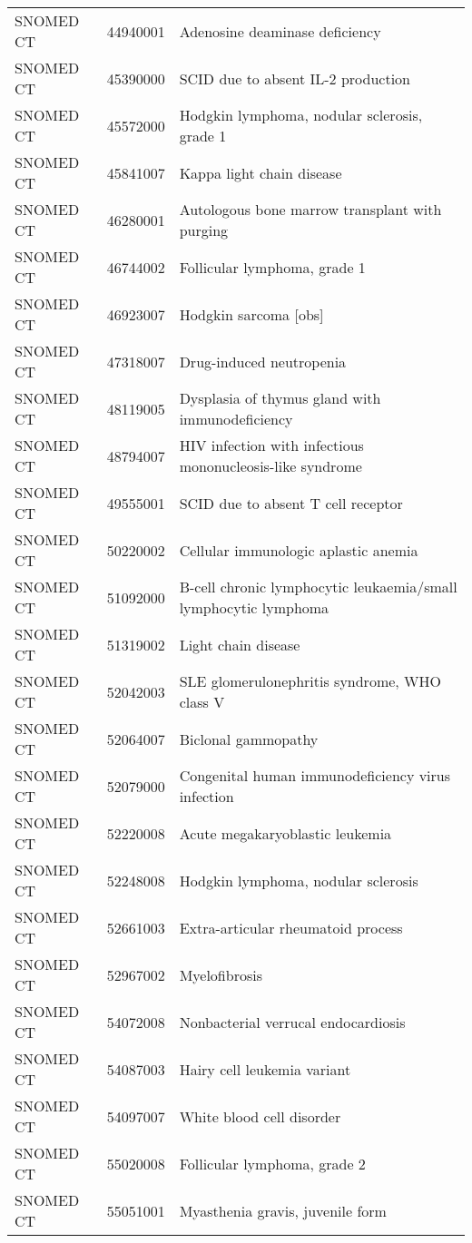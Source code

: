 \begin{longtable}{p{}p{}p{}}
  SNOMED CT & 44940001 & Adenosine deaminase deficiency \\ 
  SNOMED CT & 45390000 & SCID due to absent IL-2 production \\ 
  SNOMED CT & 45572000 & Hodgkin lymphoma, nodular sclerosis, grade 1 \\ 
  SNOMED CT & 45841007 & Kappa light chain disease \\ 
  SNOMED CT & 46280001 & Autologous bone marrow transplant with purging \\ 
  SNOMED CT & 46744002 & Follicular lymphoma, grade 1 \\ 
  SNOMED CT & 46923007 & Hodgkin sarcoma [obs] \\ 
  SNOMED CT & 47318007 & Drug-induced neutropenia \\ 
  SNOMED CT & 48119005 & Dysplasia of thymus gland with immunodeficiency \\ 
  SNOMED CT & 48794007 & HIV infection with infectious mononucleosis-like syndrome \\ 
  SNOMED CT & 49555001 & SCID due to absent T cell receptor \\ 
  SNOMED CT & 50220002 & Cellular immunologic aplastic anemia \\ 
  SNOMED CT & 51092000 & B-cell chronic lymphocytic leukaemia/small lymphocytic lymphoma \\ 
  SNOMED CT & 51319002 & Light chain disease \\ 
  SNOMED CT & 52042003 & SLE glomerulonephritis syndrome, WHO class V \\ 
  SNOMED CT & 52064007 & Biclonal gammopathy \\ 
  SNOMED CT & 52079000 & Congenital human immunodeficiency virus infection \\ 
  SNOMED CT & 52220008 & Acute megakaryoblastic leukemia \\ 
  SNOMED CT & 52248008 & Hodgkin lymphoma, nodular sclerosis \\ 
  SNOMED CT & 52661003 & Extra-articular rheumatoid process \\ 
  SNOMED CT & 52967002 & Myelofibrosis \\ 
  SNOMED CT & 54072008 & Nonbacterial verrucal endocardiosis \\ 
  SNOMED CT & 54087003 & Hairy cell leukemia variant \\ 
  SNOMED CT & 54097007 & White blood cell disorder \\ 
  SNOMED CT & 55020008 & Follicular lymphoma, grade 2 \\ 
  SNOMED CT & 55051001 & Myasthenia gravis, juvenile form \\ 

\end{longtable}
